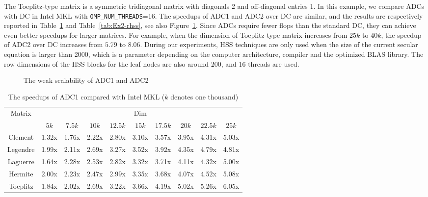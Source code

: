 \documentclass[times]{nlaauth}
\begin{document}
The Toeplitz-type matrix is a symmetric tridiagonal matrix with diagonals 2 and
off-diagonal entries 1.
In this example, we compare ADCs with DC in Intel MKL with
\texttt{OMP\_NUM\_THREADS}=16.
The speedups of ADC1 and ADC2 over DC are similar, and
the results are respectively reported in Table~\ref{tab:Ex2-srrsc} and Table~\ref{tab:Ex2-rhss},
see also Figure~\ref{fig:speedup}.
Since ADCs require fewer flops than the standard DC, they can achieve even better speedups for
larger matrices.
For example, when the dimension of Toeplitz-type matrix increases from $25k$ to
$40k$, the speedup of ADC2 over DC increases from $5.79$ to $8.06$.
During our experiments, HSS techniques are only used when the size of the current secular equation is
larger than 2000, which is a parameter depending on the computer architecture,
compiler and the optimized BLAS library.
The row dimensions of the HSS blocks for the leaf nodes are also around 200, and
16 threads are used.


\begin{figure}[ptbh]
\centering
{}
\caption{The weak scalability of ADC1 and ADC2}\label{fig:speedup}
\end{figure}

\begin{table}[ptbh]
\caption{The speedups of {ADC1} compared with Intel MKL ($k$ denotes one thousand)}
\label{tab:Ex2-srrsc}
\begin{center}\begin{tabular}
[c]{|c|ccccccccc|}\hline
\multirow{2}{*}{Matrix}  & \multicolumn{9}{c|}{Dim} \\ \cline{2-10}
  & $5k$ & $7.5k$& $10k$ & $12.5k$ & $15k$ & $17.5k$ & $20k$ &$22.5k$ & $25k$  \\ \hline \hline
Clement  & 1.32x & 1.76x & 2.22x & 2.80x & 3.10x & 3.57x & 3.95x & 4.31x & 5.03x   \\
Legendre & 1.99x & 2.11x & 2.69x & 3.27x & 3.52x & 3.92x & 4.35x & 4.79x & 4.81x  \\
Laguerre & 1.64x & 2.28x & 2.53x & 2.82x & 3.32x & 3.71x & 4.11x & 4.32x & 5.00x \\
Hermite  & 2.00x & 2.23x & 2.47x & 2.99x & 3.35x & 3.68x & 4.07x & 4.52x & 5.08x  \\
Toeplitz & 1.84x & 2.02x & 2.69x & 3.22x & 3.66x & 4.19x & 5.02x & 5.26x & 6.05x \\ \hline
\end{tabular}
\end{center}
\end{table}
\end{document}
